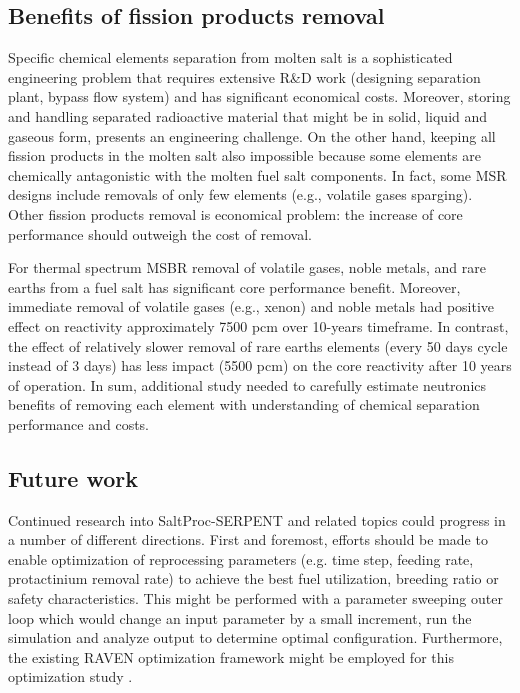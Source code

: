 \subsection{Benefits of fission products removal}
Specific chemical elements separation from molten salt is a sophisticated engineering problem that requires    extensive R\&D work (designing separation plant, bypass flow system) and has significant economical costs. Moreover, storing and handling separated radioactive material that might be in solid, liquid and gaseous form, presents an engineering challenge. On the other hand, keeping all fission products in the molten salt  also impossible because some elements are chemically antagonistic with the molten fuel salt components. In fact, some \gls{MSR} designs include removals of only few elements (e.g., volatile gases sparging). Other fission products removal is economical problem: the increase of core performance should outweigh the cost of removal.

For thermal spectrum \gls{MSBR} removal of volatile gases, noble metals, and rare earths from a fuel salt has significant core performance benefit. Moreover, immediate removal of volatile gases (e.g., xenon) and noble metals had positive effect on reactivity approximately 7500 pcm over 10-years timeframe. In contrast, the effect of relatively slower removal of rare earths elements (every 50 days cycle instead of 3 days) has less impact (5500 pcm) on the core reactivity after 10 years of operation. In sum, additional study needed to carefully estimate neutronics benefits of removing each element with understanding of chemical separation performance and costs.

\subsection{Future work}
Continued research into SaltProc-SERPENT and related topics could progress in a number of different directions. First and foremost, efforts should be made to enable optimization of reprocessing parameters (e.g. time step, feeding rate, protactinium removal rate) to achieve the best fuel utilization, breeding ratio or safety characteristics. This might be performed with a parameter sweeping outer loop which would change an input parameter by a small increment, run the simulation and analyze output to determine optimal configuration. Furthermore, the existing RAVEN optimization framework might be employed for this optimization study \cite{alfonsi_raven_2013}.

